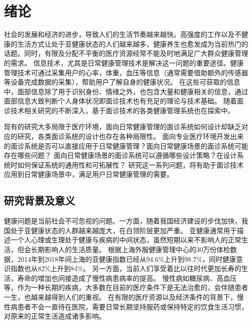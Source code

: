 \chapter{绪论}

社会的发展和经济的进步，导致人们的生活节奏越来越快。高强度的工作以及不健康的生活方式让处于亚健康状态的人们越来越多，健康养生也愈发成为当前热门的话题。同时，有限及分配不平衡的医疗资源经常不能及时地满足广大群众健康管理的需求\cite{雷鹏2019中国医疗资源配置与服务利用现状评价}。
信息技术，尤其是日常健康管理技术是解决这一问题的重要途径。健康管理技术可通过采集用户的心率，体重，血压等信息（通常需要借助额外的传感器等设备完成数据的采集），帮助用户了解自身的健康状况。
在这些可获取的信息中，面部信息除了用于识别身份、情绪之外，也包含大量和健康相关的信息，通过面部信息大致判断个人身体状况即面诊技术也有充足的理论与技术基础\cite{li2020tcminet}。
随着面诊技术相关研究的不断深入，基于面诊技术的各类健康管理系统也在探索中\cite{林锋2019中医面诊系统调研报告}。

现有的研究大多局限于医疗环境，面向日常健康管理的面诊系统如何设计却缺乏对应的研究，各类面诊系统的设计也存在各种局限性。
面向专业医疗环境开发出来的面诊系统是否可以直接应用于日常健康管理？面向日常健康场景的面诊系统可能存在哪些问题？
面向日常健康场景的面诊系统可以遵循哪些设计策略？在设计系统时如何保证系统的通用性和可拓展性？
% 
研究这一系列问题，将有助于面诊技术应用到日常健康场景中，满足用户日常健康管理的需要。

\section{研究背景及意义}
健康问题是当前社会不可忽视的问题。一方面，随着我国经济建设的步伐加快，我国处于亚健康状态的人群越来越庞大，在白领阶层更加严重。
亚健康通常用于描述一个人心理或生理处于健康与疾病的中间状态，虽然短期以来不影响人的正常生活，但会长期影响人的生活质量。
根据上海外服健康管理中心的30万份体检数据，2014年到2018年间上海的亚健康指数已经从94.6\%上升到98.7\%，同时健康意识指数也从82\%上升到84\%\cite{health_report2019}。
另一方面，当前人们享受着比以往时代更加长寿的生活，寿命的增加也间接造成了慢性病患病率的提高\cite{OlshanskyDEMOGRAPHY}。
慢性病如糖尿病、高血压等，作为一种长期的疾病，大多数在目前的医疗条件下是无法治愈的，会伴随患者一生，也越来越得到人们的重视\cite{blandford2019hci}。
在有限的医疗资源以及经济条件的背景下，慢性病患者不会一直待在医院，需要日常长期坚持服药或保持特定的饮食生活习惯，对原来的正常生活造成诸多影响\cite{lupton2017self-tracking}。

